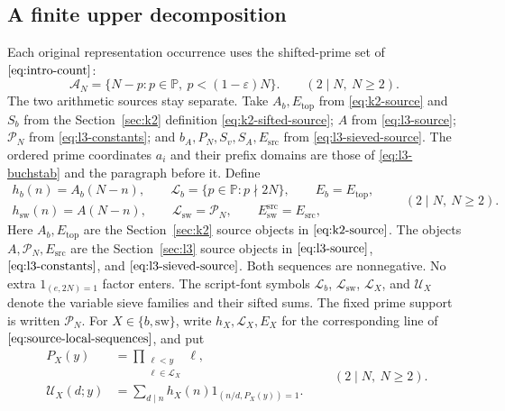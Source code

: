 \subsection{A finite upper decomposition}

Each original representation occurrence uses the shifted-prime set
of \(\eqref{eq:intro-count}\):
\begin{equation}\label{eq:source-A-N}
 \mathcal A_N=\{N-p:p\in\mathbb P,\ p<(1-\varepsilon)N\}.
\qquad(2\mid N,\ N\ge2).
\end{equation}
The two arithmetic sources stay separate. Take \(A_b,E_{\mathrm{top}}\)
from \eqref{eq:k2-source} and \(S_b\) from the Section~\ref{sec:k2} definition
\eqref{eq:k2-sifted-source}; \(A\) from \eqref{eq:l3-source};
\(\mathcal P_N\) from \eqref{eq:l3-constants}; and
\(b_A,P_N,S_v,S_A,E_{\mathrm{src}}\) from
\eqref{eq:l3-sieved-source}. The ordered prime coordinates
\(a_i\) and their prefix domains are those of \eqref{eq:l3-buchstab} and
the paragraph before it. Define
\begin{equation}\label{eq:source-local-sequences}
\begin{gathered}
 h_b(n)=A_b(N-n),\qquad
 \mathscr L_b=\{p\in\mathbb P:p\nmid2N\},\qquad E_b=E_{\mathrm{top}},\\
 h_{\mathrm{sw}}(n)=A(N-n),\qquad
 \mathscr L_{\mathrm{sw}}=\mathcal P_N,\qquad
 E_{\mathrm{sw}}^{\mathrm{src}}=E_{\mathrm{src}},
\end{gathered}
\qquad(2\mid N,\ N\ge2).
\end{equation}
Here \(A_b,E_{\mathrm{top}}\) are the Section~\ref{sec:k2} source objects in
\(\eqref{eq:k2-source}\). The objects \(A,\mathcal P_N,E_{\mathrm{src}}\) are
the Section~\ref{sec:l3} source objects in \(\eqref{eq:l3-source}\),
\(\eqref{eq:l3-constants}\), and \(\eqref{eq:l3-sieved-source}\). Both sequences are nonnegative.
No extra \(1_{(e,2N)=1}\) factor enters.
The script-font symbols \(\mathscr L_b\), \(\mathscr L_{\mathrm{sw}}\),
\(\mathscr L_X\), and \(\mathscr U_X\) denote the variable sieve families
and their sifted sums. The fixed prime support is written \(\mathcal P_N\).
For \(X\in\{b,\mathrm{sw}\}\), write \(h_X,\mathscr L_X,E_X\) for the
corresponding line of \(\eqref{eq:source-local-sequences}\), and put
\begin{equation}\label{eq:source-sifted-sequence}
\begin{aligned}
 P_X(y)&=\prod_{\substack{\ell<y\\\ell\in\mathscr L_X}}\ell,\\
 \mathscr U_X(d;y)&=\sum_{d\mid n}h_X(n)
              1_{(n/d,P_X(y))=1}.
\end{aligned}
\qquad(2\mid N,\ N\ge2).
\end{equation}
